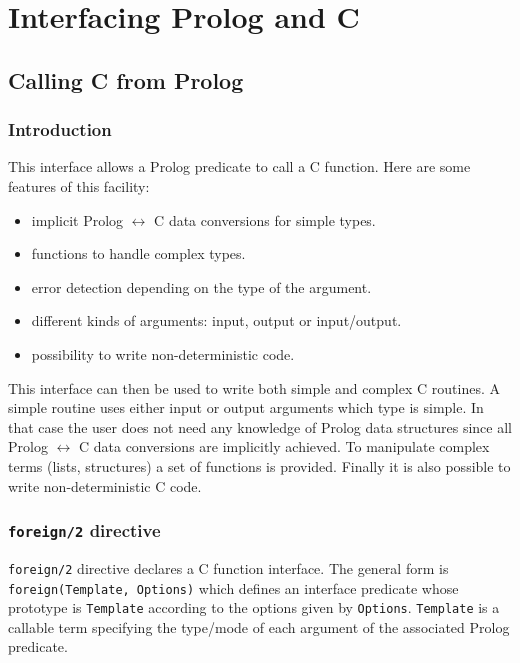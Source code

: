 \newpage
\section{Interfacing Prolog and C}
\label{Interfacing-Prolog-and-C}
\subsection{Calling C from Prolog}
\label{Calling-C-from-Prolog}

\subsubsection{Introduction}
This interface allows a Prolog predicate to call a C function. Here are some
features of this facility:

\begin{itemize}

\item implicit Prolog $\leftrightarrow$ C data conversions for simple types.

\item functions to handle complex types.

\item error detection depending on the type of the argument.

\item different kinds of arguments: input, output or input/output.

\item possibility to write non-deterministic code.

\end{itemize}

This interface can then be used to write both simple and complex C routines.
A simple routine uses either input or output arguments which type is simple.
In that case the user does not need any knowledge of Prolog data structures
since all Prolog $\leftrightarrow$ C data conversions are implicitly
achieved. To manipulate complex terms (lists, structures) a set of
functions is provided. Finally it is also possible to write
non-deterministic C code.

\subsubsection{\texttt{foreign/2} directive}
\label{foreign/2-directive}

\texttt{foreign/2} directive  declares a C function interface. 
The general form is \texttt{foreign(Template, Options)} which defines an
interface predicate whose prototype is \texttt{Template} according to the
options given by \texttt{Options}. \texttt{Template} is a callable term
specifying the type/mode of each argument of the associated Prolog predicate.

